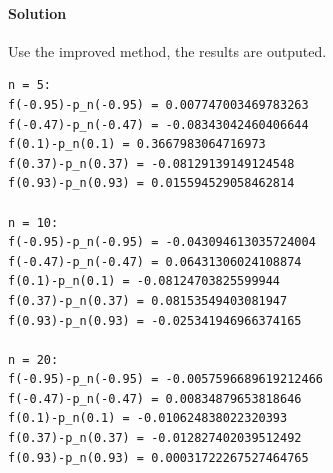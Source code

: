 \documentclass[UTF8,hyperref]{article}
\begin{document}
\paragraph{Solution} Use the improved method, the results are outputed.
\begin{lstlisting}
n = 5:
f(-0.95)-p_n(-0.95) = 0.007747003469783263
f(-0.47)-p_n(-0.47) = -0.08343042460406644
f(0.1)-p_n(0.1) = 0.3667983064716973
f(0.37)-p_n(0.37) = -0.08129139149124548
f(0.93)-p_n(0.93) = 0.015594529058462814

n = 10:
f(-0.95)-p_n(-0.95) = -0.043094613035724004
f(-0.47)-p_n(-0.47) = 0.06431306024108874
f(0.1)-p_n(0.1) = -0.08124703825599944
f(0.37)-p_n(0.37) = 0.08153549403081947
f(0.93)-p_n(0.93) = -0.025341946966374165

n = 20:
f(-0.95)-p_n(-0.95) = -0.0057596689619212466
f(-0.47)-p_n(-0.47) = 0.00834879653818646
f(0.1)-p_n(0.1) = -0.010624838022320393
f(0.37)-p_n(0.37) = -0.012827402039512492
f(0.93)-p_n(0.93) = 0.00031722267527464765
\end{lstlisting}
\end{document}
